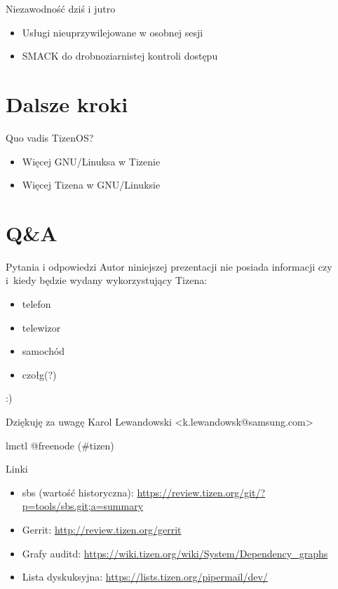 \documentclass[presentation,aspectratio=43,12pt]{beamer}
\begin{document}
\begin{frame}[label=sec-5-3]{Niezawodność dziś i jutro}
\begin{itemize}
\item Usługi nieuprzywilejowane w osobnej sesji

\item SMACK do drobnoziarnistej kontroli dostępu
\end{itemize}
\end{frame}
\section{Dalsze kroki}
\label{sec-6}

\begin{frame}[label=sec-6-1]{Quo vadis TizenOS?}
\begin{itemize}
\item Więcej GNU/Linuksa w Tizenie
\item <2-> Więcej Tizena w GNU/Linuksie
\end{itemize}
\end{frame}

\section{Q\&A}
\label{sec-7}

\begin{frame}[label=sec-7-1]{Pytania i odpowiedzi}
Autor niniejszej prezentacji nie posiada informacji czy i~kiedy będzie
wydany wykorzystujący Tizena:

\begin{itemize}
\item telefon
\item telewizor
\item samochód
\item czołg(?)
\end{itemize}

:)
\end{frame}

\begin{frame}[label=sec-7-2]{Dziękuję za uwagę}
Karol Lewandowski <k.lewandowsk@samsung.com>

lmctl @freenode (\#tizen)
\end{frame}

\begin{frame}[label=sec-7-3]{Linki}
\begin{itemize}
\item sbs (wartość historyczna): \url{https://review.tizen.org/git/?p=tools/sbs.git;a=summary}

\item Gerrit:  \url{http://review.tizen.org/gerrit}

\item Grafy auditd: \url{https://wiki.tizen.org/wiki/System/Dependency_graphs}

\item Lista dyskuksyjna: \url{https://lists.tizen.org/pipermail/dev/}
\end{itemize}
\end{frame}
\end{document}

